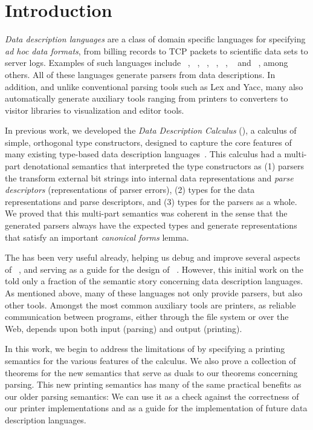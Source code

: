 \section{Introduction}
\label{sec:intro}

{\em Data description languages} are a class of domain specific
languages for specifying {\em ad hoc data formats}, from billing 
records to TCP packets to scientific data sets to server logs.  Examples 
of such languages include 
\bro~\cite{paxson:bro}, \datascript{}~\cite{gpce02}, \demeter~\cite{lieberherr+:class-dictionaries},
\packettypes{}~\cite{sigcomm00}, \padsc{}~\cite{fisher+:pads}, 
\padsml{}~\cite{mandelbaum+:padsml}  and
\xsugar~\cite{xsugar2005}, among others.  All of these languages
generate parsers from data descriptions.  In addition, and unlike
conventional parsing tools such as Lex and Yacc, many also automatically
generate auxiliary tools ranging from printers to \xml{} converters to
visitor libraries to visualization and editor tools.

In previous work, we developed the {\em Data Description Calculus}
(\ddcold{}), a calculus of simple, orthogonal type constructors,
designed to capture the core features of many existing type-based data
description languages~\cite{fisher+:next700ddl,fisher+:ddcjournal}.
This calculus had a multi-part denotational semantics that interpreted
the type constructors as (1) parsers the transform external bit
strings into internal data representations and {\em parse descriptors}
(representations of parser errors), (2) types for the data
representations and parse descriptors, and (3) types for the parsers
as a whole.  We proved that this multi-part semantics was coherent in
the sense that the generated parsers always have the expected types
and generate representations that satisfy an important {\em
canonical forms} lemma.

The \ddcold{} has been very useful already, helping us debug and
improve several aspects of \padsc{}~\cite{fisher+:pads}, and serving
as a guide for the design of \padsml{}~\cite{mandelbaum+:padsml}.
However, this initial work on the \ddcold{} told only a fraction of the
semantic story concerning data description languages.  As mentioned
above, many of these languages not only provide parsers, but
also other tools.  Amongst the most common auxiliary tools
are printers, as reliable communication between programs, either through
the file system or over the Web, depends upon both input (parsing) 
and output (printing).

In this work, we begin to address the limitations of
\ddcold{} by specifying a printing semantics for the
various features of the calculus.  We also
prove a collection of theorems for the new semantics that serve as
duals to our theorems concerning parsing.  This new printing semantics
has many of the same practical benefits as our older parsing 
semantics: We can
use it as a check against the correctness of our printer
implementations and as a guide for the
implementation of future data description languages.  


